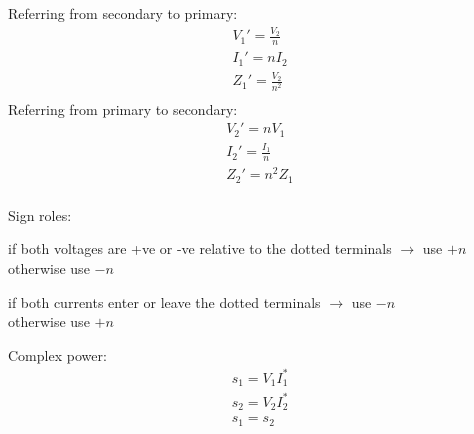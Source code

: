 \documentclass[a4paper]{article}
\begin{document}
\begin{multicols}{3}
\begin{multicols}{2}
Referring from secondary to primary:
\begin{align*}
V_1' = \frac{V_2}{n} \\
I_1' = nI_2\\
Z_1' = \frac{V_2}{n^2}\\
\end{align*}
Referring from primary to secondary:
\begin{align*}
V_2' = n V_1 \\
I_2' = \frac{I_1}{n}\\
Z_2' = n^2 Z_1\\
\end{align*}
\end{multicols}

Sign roles:

if both voltages are +ve or -ve relative to the dotted terminals $\rightarrow$ use $+n$\\otherwise use $-n$

if both currents enter or leave the  dotted terminals $\rightarrow$ use $-n$\\otherwise use $+n$


\begin{figure}[H]
    \centering
    \qquad
    \label{fig:example}%
\end{figure}

Complex power:
\begin{align*}
s_1 = V_1 I_1^*\\
s_2 = V_2 I_2^*\\
\boxed{s_1 = s_2}
\end{align*}


\end{multicols}
\end{document}
